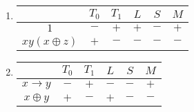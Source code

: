 \begin{solution}
  \begin{enumerate}[1)]
  \item
    \begin{tabular}[b]{|c|c|c|c|c|c|}
      \hline
      & $T_0$ & $T_1$ & $L$ & $S$ & $M$\\
      \hline
      $1$ & $-$ & $+$ & $+$ & $-$ & $+$\\
      \hline
      $xy(x\oplus z)$ & $+$ & $-$ & $-$ & $-$ & $-$\\
      \hline
    \end{tabular}
  \item
    \begin{tabular}[b]{|c|c|c|c|c|c|}
      \hline
      & $T_0$ & $T_1$ & $L$ & $S$ & $M$\\
      \hline
      $x\rightarrow y$ & $-$ & $+$ & $-$ & $-$ & $+$\\
      \hline
      $x\oplus y$ & $+$ & $-$ & $+$ & $-$ & $-$\\
      \hline
    \end{tabular}
  \end{enumerate}
\end{solution}



